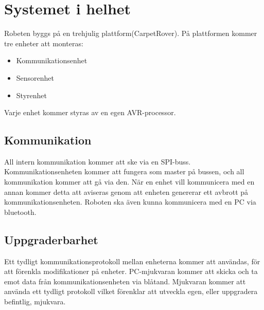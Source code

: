 \section{Systemet i helhet}
Robeten byggs på en trehjulig plattform(CarpetRover). På plattformen kommer tre enheter att monteras:
\begin{itemize}
        \item Kommunikationsenhet
        \item Sensorenhet
        \item Styrenhet
\end{itemize}
Varje enhet kommer styras av en egen AVR-processor.

\subsection{Kommunikation}
All intern kommunikation kommer att ske via en SPI-buss. Kommunikationsenheten kommer att fungera som master på bussen, och all kommunikation kommer att gå via den. När en enhet vill kommunicera med en annan kommer detta att aviseras genom att enheten genererar ett avbrott på kommunikationsenheten. 
Roboten ska även kunna kommunicera med en PC via bluetooth.

\subsection{Uppgraderbarhet}
Ett tydligt kommunikationsprotokoll mellan enheterna kommer att användas, för att förenkla modifikationer på enheter. PC-mjukvaran kommer att skicka och ta emot data från kommunikationsenheten via blåtand.
Mjukvaran kommer att använda ett tydligt protokoll vilket förenklar att utveckla egen, eller uppgradera befintlig, mjukvara.
